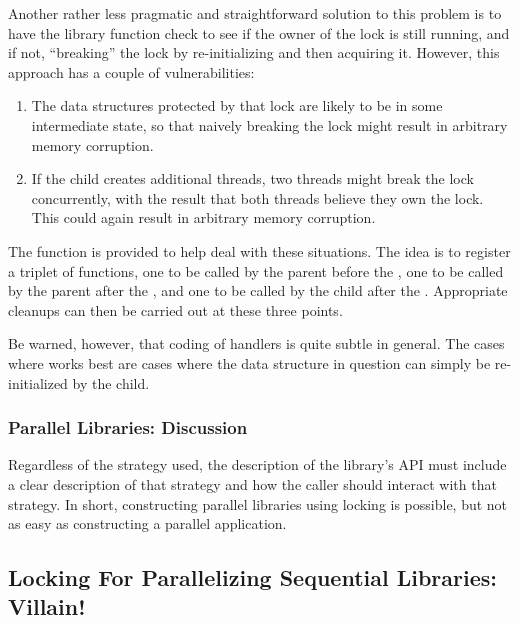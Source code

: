 Another rather less pragmatic and straightforward solution to this problem
is to have the library function check to see if the owner of the lock
is still running, and if not, ``breaking'' the lock by re-initializing
and then acquiring it.
However, this approach has a couple of vulnerabilities:

\begin{enumerate}
\item	The data structures protected by that lock are likely to
	be in some intermediate state, so that naively breaking the lock
	might result in arbitrary memory corruption.
\item	If the child creates additional threads, two threads might
	break the lock concurrently, with the result that both
	threads believe they own the lock.
	This could again result in arbitrary memory corruption.
\end{enumerate}

The  function is provided to help deal with these situations.
The idea is to register a triplet of functions, one to be called by the
parent before the , one to be called by the parent after the
, and one to be called by the child after the .
Appropriate cleanups can then be carried out at these three points.

Be warned, however, that coding of  handlers is quite subtle
in general.
The cases where  works best are cases where the data structure
in question can simply be re-initialized by the child.

\subsubsection{Parallel Libraries: Discussion}
\label{sec:locking:Parallel Libraries: Discussion}

Regardless of the strategy used, the description of the library's API
must include a clear description of that strategy and how the caller
should interact with that strategy.
In short, constructing parallel libraries using locking is possible,
but not as easy as constructing a parallel application.

\subsection{Locking For Parallelizing Sequential Libraries: Villain!}
\label{sec:locking:Locking For Parallelizing Sequential Libraries: Villain!}

